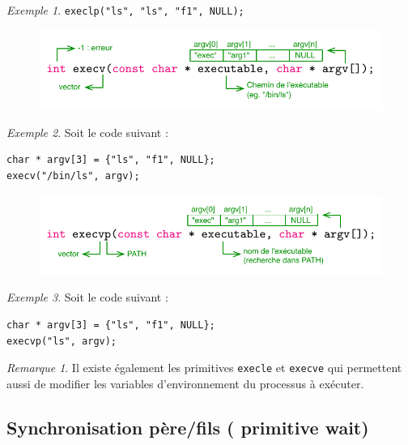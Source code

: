 \documentclass[11pt,english,french]{scrreprt}
\theoremstyle{remark}
\newtheorem*{rem*}{Remarque}
\newtheorem*{ex*}{Exemple}
\theoremstyle{definition}
\begin{document}
\begin{ex*}
	\lstinline!execlp("ls", "ls", "f1", NULL);!
\end{ex*}

\begin{figure}[h!]
	\center
	\vspace{-20pt}
	\includegraphics[scale=.75]{img/execv}
	\vspace{-10pt}
\end{figure}

\begin{ex*}
	Soit le code suivant :
\begin{lstlisting}
char * argv[3] = {"ls", "f1", NULL};
execv("/bin/ls", argv);
\end{lstlisting}
\end{ex*}

\begin{figure}[h!]
	\center
	\vspace{-20pt}
	\includegraphics[scale=.75]{img/execvp}
	\vspace{-10pt}
\end{figure}

\begin{ex*}
	Soit le code suivant :
\begin{lstlisting}
char * argv[3] = {"ls", "f1", NULL};
execvp("ls", argv);
\end{lstlisting}
\end{ex*}

\begin{rem*}
	Il existe également les primitives \lstinline!execle! et \lstinline!execve! qui permettent aussi de modifier les variables d'environnement du processus à exécuter.
\end{rem*}

\subsection{Synchronisation père/fils ( primitive wait)}
\end{document}
